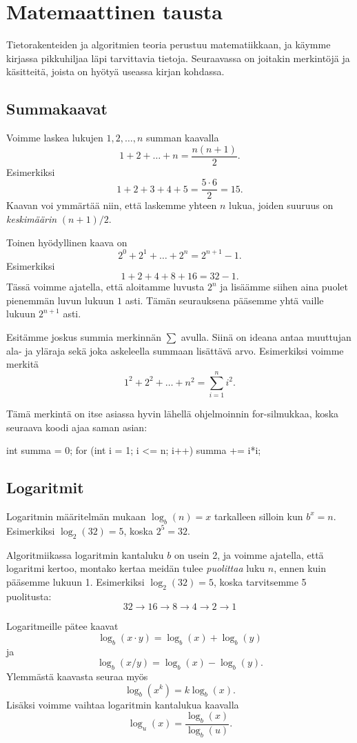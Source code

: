 \section{Matemaattinen tausta}

Tietorakenteiden ja algoritmien teoria perustuu matematiikkaan,
ja käym\-me kirjassa pikkuhiljaa läpi tarvittavia tietoja.
Seuraavassa on joitakin merkintöjä ja käsitteitä, joista on hyötyä
useassa kirjan kohdassa.

\subsection{Summakaavat}

Voimme laskea lukujen $1,2,\dots,n$ summan kaavalla
\[1+2+\dots+n = \frac{n(n+1)}{2}.\]
Esimerkiksi
\[1+2+3+4+5 = \frac{5 \cdot 6}{2}=15.\]
Kaavan voi ymmärtää niin, että laskemme yhteen $n$ lukua,
joiden suuruus on \emph{keskimäärin} $(n+1)/2$.

Toinen hyödyllinen kaava on
\[2^0+2^1+\dots+2^n = 2^{n+1}-1.\]
Esimerkiksi
\[1+2+4+8+16=32-1.\]
Tässä voimme ajatella, että aloitamme luvusta $2^n$
ja lisäämme siihen aina puolet pienemmän luvun lukuun $1$ asti.
Tämän seurauksena pääsemme yhtä vaille lukuun $2^{n+1}$ asti.

Esitämme joskus summia merkinnän $\sum$ avulla.
Siinä on ideana antaa muuttujan ala- ja yläraja sekä
joka askeleella summaan lisättävä arvo.
Esimerkiksi voimme merkitä
\[1^2 + 2^2 + \dots + n^2 = \sum_{i=1}^n i^2.\]

Tämä merkintä on itse asiassa hyvin lähellä ohjelmoinnin
for-silmukkaa, koska seuraava koodi ajaa saman asian:

\begin{code}
int summa = 0;
for (int i = 1; i <= n; i++) {
    summa += i*i;
}
\end{code}

\subsection{Logaritmit}

Logaritmin määritelmän mukaan $\log_b(n)=x$
tarkalleen silloin kun $b^x=n$.
Esimerkiksi $\log_2(32)=5$, koska $2^5=32$.

Algoritmiikassa logaritmin kantaluku $b$ on usein 2,
ja voimme ajatella, että logaritmi kertoo, montako kertaa
meidän tulee \emph{puolittaa} luku $n$, ennen kuin pääsemme lukuun 1.
Esimerkiksi $\log_2(32)=5$, koska tarvitsemme 5 puolitusta:
\[32 \rightarrow 16 \rightarrow 8 \rightarrow 4 \rightarrow 2 \rightarrow 1\]

Logaritmeille pätee kaavat
\[\log_b(x \cdot y) = \log_b(x)+\log_b(y)\]
ja
\[\log_b(x / y) = \log_b(x)-\log_b(y).\]
Ylemmästä kaavasta seuraa myös
\[\log_b(x^k) = k \log_b(x).\]
Lisäksi voimme vaihtaa logaritmin kantalukua kaavalla
\[\log_u(x) = \frac{\log_b(x)}{\log_b(u)}.\]